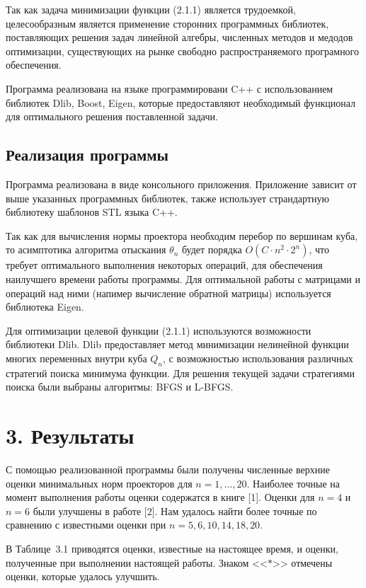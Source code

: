 \documentclass[14pt,a4paper]{extbook}
\begin{document}
Так как задача минимизации функции (2.1.1) является трудоемкой, целесообразным является применение сторонних программных библиотек, поставляющих решения задач линейной алгебры, численных методов и медодов оптимизации, существующих на рынке свободно распространяемого програмного обеспечения.

Программа реализована на языке программировани C++ с использованием библиотек Dlib, Boost, Eigen, которые предоставляют необходимый функционал для оптимального решения поставленной задачи.

\subsection*{Реализация программы}
Программа реализована в виде консольного приложения. Приложение зависит от выше указанных программных библиотек, также использует страндартную библиотеку шаблонов STL языка C++. 

Так как для вычисления нормы проектора необходим перебор по вершинам куба, то асимптотика алгоритма отыскания $\theta_n$ будет порядка $O(C\cdot n^2\cdot 2^n)$, что требует оптимального выполнения некоторых операций, для обеспечения наилучшего времени работы программы. Для оптимальной работы с матрицами и операций над ними (напимер вычисление обратной матрицы) используется библиотека Eigen.

Для оптимизации целевой функции (2.1.1) используются возможности библиотеки Dlib. Dlib предоставляет метод минимизации нелинейной функции многих переменных внутри куба $Q_n$, с возможностью использования различных стратегий поиска минимума функции. Для решения текущей задачи стратегиями поиска были выбраны алгоритмы: BFGS и L-BFGS.


\section*{3. Результаты} 

С помощью реализованной программы были получены численные верхние оценки минимальных норм проекторов для $n=1,\ldots,20$. Наиболее точные на момент выполнения работы оценки 
содержатся в книге [1]. Оценки для $n = 4$ и $n = 6$ были улучшены в работе [2].
Нам удалось найти более точные по сравнению с известными оценки при  $n = 5, 6, 10, 14, 18, 20$.

В Таблице~3.1 приводятся оценки, известные на настоящее время, и оценки, полученные при выполнении настоящей работы. Знаком  <<$*$>> отмечены оценки, которые удалось улучшить.
\end{document}
